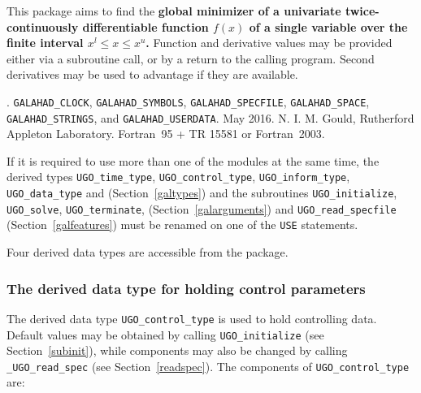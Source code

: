 \documentclass{galahad}
\newcommand{\packagename}{UGO}
\newcommand{\fullpackagename}{\libraryname\_\packagename}
\begin{document}
\galheader


\galsummary
This package aims to find the {\bf global minimizer of a univariate
twice-continuously differentiable function $f(x)$ of a single variable
over the finite interval $x^l \leq x \leq x^u$.} Function and derivative
values may be provided either via a subroutine call, or by a return
to the calling program. Second derivatives may be used to advantage if
they are available.


\galattributes
\galversions{\tt  \fullpackagename\_single, \fullpackagename\_double}.
\galuses
{\tt GALAHAD\_CLOCK},
{\tt GALAHAD\_SY\-M\-BOLS},
{\tt GALAHAD\_SPECFILE},
{\tt GALAHAD\_SPACE},
{\tt GALAHAD\_STRINGS},
and
{\tt GALAHAD\_USERDATA}.
\galdate May 2016.
\galorigin N. I. M. Gould, Rutherford Appleton Laboratory.
\gallanguage Fortran~95 + TR 15581 or Fortran~2003.


\galhowto



\noindent
If it is required to use more than one of the modules at the same time, 
the derived types
{\tt \packagename\_time\_\-type},
{\tt \packagename\_control\_type},
{\tt \packagename\_inform\_type},
{\tt \packagename\_data\_type}
and
(Section~\ref{galtypes})
and the subroutines
{\tt \packagename\_initialize},
{\tt \packagename\_\-solve},
{\tt \packagename\_terminate},
(Section~\ref{galarguments})
and
{\tt \packagename\_read\_specfile}
(Section~\ref{galfeatures})
must be renamed on one of the {\tt USE} statements.





\galtypes
Four derived data types are accessible from the package.


\subsubsection{The derived data type for holding control
 parameters}\label{typecontrol}
The derived data type
{\tt \packagename\_control\_type}
is used to hold controlling data. Default values may be obtained by calling
{\tt \packagename\_initialize}
(see Section~\ref{subinit}),
while components may also be changed by calling
{\tt \fullpackagename\_read\-\_spec}
(see Section~\ref{readspec}).
The components of
{\tt \packagename\_control\_type}
are:
\end{document}
